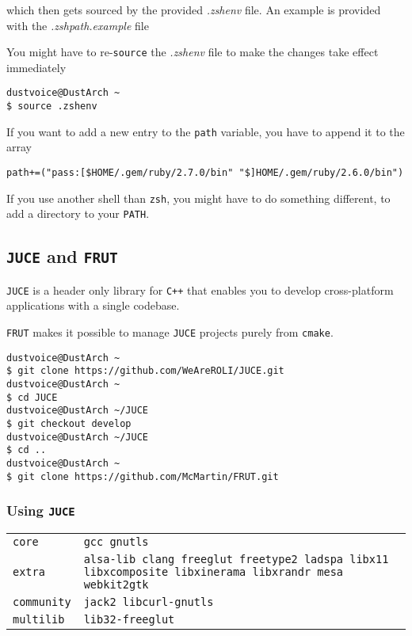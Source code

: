 \documentclass[9pt]{report}
\newenvironment{NOTE}
{\begin{tcolorbox}[colback=admonitionBG,coltitle=draculaFG,colframe=draculaBlue,colbacktitle=draculaBlue,title=NOTE]}
{\end{tcolorbox}}
\newenvironment{packagetable}
{\begin{longtabu}to \textwidth [b]{X[1,r]|X[1,l]}}
{\end{longtabu}}
\begin{document}
which then gets sourced by the provided \textit{.zshenv} file.
An example is provided with the \textit{.zshpath.example} file


\begin{NOTE}
    You might have to re-\texttt{source} the \textit{.zshenv} file to make the changes take effect immediately


    \begin{verbatim}
dustvoice@DustArch ~
$ source .zshenv
    \end{verbatim}
\end{NOTE}
\begin{NOTE}
    If you want to add a new entry to the \texttt{path} variable, you have to append it to the array


    \begin{verbatim}
path+=("pass:[$HOME/.gem/ruby/2.7.0/bin" "$]HOME/.gem/ruby/2.6.0/bin")
    \end{verbatim}
\end{NOTE}
\begin{NOTE}
    If you use another shell than \texttt{zsh}, you might have to do something different, to add a directory to your \texttt{PATH}.

\end{NOTE}

\newpage

\hypertarget{x-juce-and-frut}{\subsection{\texttt{JUCE} and \texttt{FRUT}}}
\texttt{JUCE} is a header only library for \texttt{C++} that enables you to develop cross-platform applications with a single codebase.


\texttt{FRUT} makes it possible to manage \texttt{JUCE} projects purely from \texttt{cmake}.


\begin{verbatim}
dustvoice@DustArch ~
$ git clone https://github.com/WeAreROLI/JUCE.git
dustvoice@DustArch ~
$ cd JUCE
dustvoice@DustArch ~/JUCE
$ git checkout develop
dustvoice@DustArch ~/JUCE
$ cd ..
dustvoice@DustArch ~
$ git clone https://github.com/McMartin/FRUT.git
\end{verbatim}


\newpage

\hypertarget{x-using-juce}{\subsubsection{Using \texttt{JUCE}}}
\begin{packagetable}
    \texttt{core} & \texttt{gcc gnutls} \\ 
    \texttt{extra} & \texttt{alsa-lib clang freeglut freetype2 ladspa libx11 libxcomposite libxinerama libxrandr mesa webkit2gtk} \\ 
    \texttt{community} & \texttt{jack2 libcurl-gnutls} \\ 
    \texttt{multilib} & \texttt{lib32-freeglut} \\ 
\end{packagetable}
\end{document}

